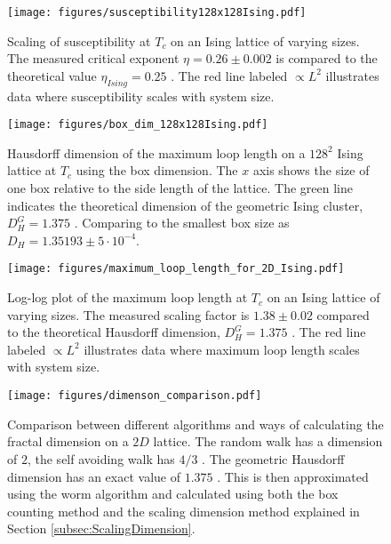 
\begin{figure}[h!]
    \centering
        \texttt{[image: figures/susceptibility128x128Ising.pdf]}
    \caption{Scaling of susceptibility at $T_c$ on an Ising lattice of varying sizes. The measured critical exponent $\eta = 0.26 \pm 0.002$ is compared to the theoretical value $\eta_{Ising} = 0.25$ \cite{Plischke:EqStatMech}. The red line labeled $\propto L^2$ illustrates data where susceptibility scales with system size.}
    \label{fig:results_isingsusc}
\end{figure}

\begin{figure}[h!]
    \centering
        \texttt{[image: figures/box\_dim\_128x128Ising.pdf]}
    \caption{Hausdorff dimension of the maximum loop length on a $128^2$ Ising lattice at $T_c$ using the box dimension. The $x$ axis shows the size of one box relative to the side length of the lattice. The green line indicates the theoretical dimension of the geometric Ising cluster, $D_H^G = 1.375$ \cite{Duplantier:GeoHausdorff}. Comparing to the smallest box size as $D_H = 1.35193 \pm 5 \cdot 10^{-4}$.}
    \label{fig:results_boxdimension}
\end{figure}

\begin{figure}[h!]
    \centering
        \texttt{[image: figures/maximum\_loop\_length\_for\_2D\_Ising.pdf]}
    \caption{Log-log plot of the maximum loop length at $T_c$ on an Ising lattice of varying sizes. The measured scaling factor is $1.38 \pm 0.02$ compared to the theoretical Hausdorff dimension, $D_H^G = 1.375$ \cite{Duplantier:GeoHausdorff}. The red line labeled $\propto L^2$ illustrates data where maximum loop length scales with system size.}
    \label{fig:results_maxloopdimension}
\end{figure}

\begin{figure}[h!]
    \centering
        \texttt{[image: figures/dimenson\_comparison.pdf]}
    \caption{Comparison between different algorithms and ways of calculating the fractal dimension on a $2D$ lattice. The random walk has a dimension of $2$, the self avoiding walk has $4/3$ \cite{Vilgis:FlorySAW}. The geometric Hausdorff dimension has an exact value of $1.375$ \cite{Duplantier:GeoHausdorff}. This is then approximated using the worm algorithm and calculated using both the box counting method and the scaling dimension method explained in Section \ref{subsec:ScalingDimension}.}
    \label{fig:comparsion_2d_lattice_dimensions}
\end{figure}


